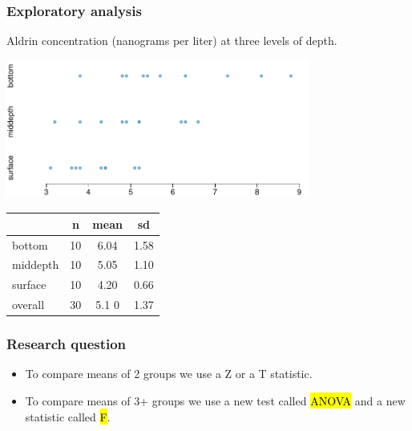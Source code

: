 \begin{frame}
\frametitle{Exploratory analysis}

Aldrin concentration (nanograms per liter) at three levels of depth. \\

\begin{center}
\includegraphics[width=0.75\textwidth]{7-5_anova/figures/aldrin/dotplot}
\end{center}

\begin{center}
\begin{tabular}{l | c c c}
		& n	& mean	& sd		\\
\hline
bottom	& 10	& 6.04	& 1.58 \\
middepth& 10	& 5.05	& 1.10 \\
surface	& 10	& 4.20	& 0.66 \\
\hline
overall	& 30	& 5.1	0	& 1.37
\end{tabular}
\end{center}

\end{frame}


\begin{frame}
\frametitle{Research question}


\vspace{0.5cm}

\pause

\begin{itemize}

\item To compare means of 2 groups we use a Z or a T statistic.

\pause

\item To compare means of 3+ groups we use a new test called \hl{ANOVA} and a new statistic called \hl{F}.

\end{itemize}

\end{frame}

